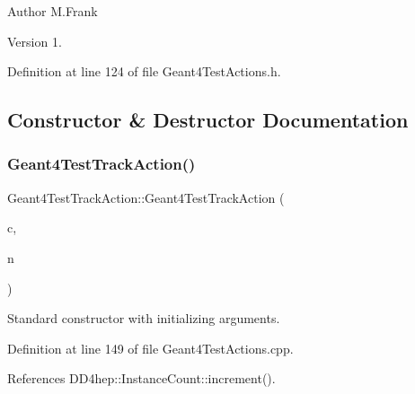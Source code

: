 \begin{DoxyAuthor}{Author}
M.\+Frank 
\end{DoxyAuthor}
\begin{DoxyVersion}{Version}
1. 
\end{DoxyVersion}


Definition at line 124 of file Geant4\+Test\+Actions.\+h.



\subsection{Constructor \& Destructor Documentation}
\hypertarget{class_d_d4hep_1_1_simulation_1_1_test_1_1_geant4_test_track_action_a5dcd49bcdb620730e97cb2f6b3c3cd0d}{}\label{class_d_d4hep_1_1_simulation_1_1_test_1_1_geant4_test_track_action_a5dcd49bcdb620730e97cb2f6b3c3cd0d} 
\subsubsection{\texorpdfstring{Geant4\+Test\+Track\+Action()}{Geant4TestTrackAction()}}
{\footnotesize\ttfamily Geant4\+Test\+Track\+Action\+::\+Geant4\+Test\+Track\+Action (\begin{DoxyParamCaption}\item[{\hyperlink{class_d_d4hep_1_1_simulation_1_1_geant4_context}{Geant4\+Context} $\ast$}]{c,  }\item[{const std\+::string \&}]{n }\end{DoxyParamCaption})}



Standard constructor with initializing arguments. 



Definition at line 149 of file Geant4\+Test\+Actions.\+cpp.



References D\+D4hep\+::\+Instance\+Count\+::increment().

\hypertarget{class_d_d4hep_1_1_simulation_1_1_test_1_1_geant4_test_track_action_aede90b2245482e02e82e959b30a1e2df}{}\label{class_d_d4hep_1_1_simulation_1_1_test_1_1_geant4_test_track_action_aede90b2245482e02e82e959b30a1e2df} 
